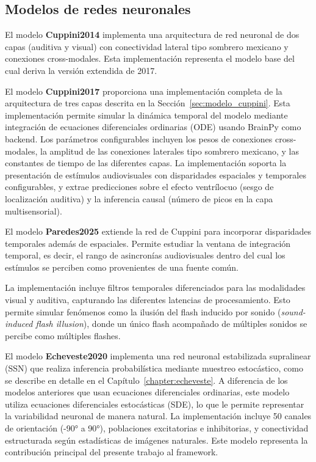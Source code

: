 \subsection{Modelos de redes neuronales}
\label{subsec:snmsi_neurales}

El modelo \textbf{Cuppini2014} implementa una arquitectura de red neuronal de dos capas (auditiva y visual) con conectividad lateral tipo sombrero mexicano y conexiones cross-modales. Esta implementación representa el modelo base del cual deriva la versión extendida de 2017.

El modelo \textbf{Cuppini2017} proporciona una implementación completa de la arquitectura de tres capas descrita en la Sección~\ref{sec:modelo_cuppini}. Esta implementación permite simular la dinámica temporal del modelo mediante integración de ecuaciones diferenciales ordinarias (ODE) usando BrainPy como backend. Los parámetros configurables incluyen los pesos de conexiones cross-modales, la amplitud de las conexiones laterales tipo sombrero mexicano, y las constantes de tiempo de las diferentes capas. La implementación soporta la presentación de estímulos audiovisuales con disparidades espaciales y temporales configurables, y extrae predicciones sobre el efecto ventrílocuo (sesgo de localización auditiva) y la inferencia causal (número de picos en la capa multisensorial).

El modelo \textbf{Paredes2025} extiende la red de Cuppini para incorporar disparidades temporales además de espaciales. Permite estudiar la ventana de integración temporal, es decir, el rango de asincronías audiovisuales dentro del cual los estímulos se perciben como provenientes de una fuente común.

La implementación incluye filtros temporales diferenciados para las modalidades visual y auditiva, capturando las diferentes latencias de procesamiento. Esto permite simular fenómenos como la ilusión del flash inducido por sonido (\textit{sound-induced flash illusion}), donde un único flash acompañado de múltiples sonidos se percibe como múltiples flashes.

El modelo \textbf{Echeveste2020} implementa una red neuronal estabilizada supralinear (SSN) que realiza inferencia probabilística mediante muestreo estocástico, como se describe en detalle en el Capítulo~\ref{chapter:echeveste}. A diferencia de los modelos anteriores que usan ecuaciones diferenciales ordinarias, este modelo utiliza ecuaciones diferenciales estocásticas (SDE), lo que le permite representar la variabilidad neuronal de manera natural. La implementación incluye 50 canales de orientación (-90° a 90°), poblaciones excitatorias e inhibitorias, y conectividad estructurada según estadísticas de imágenes naturales. Este modelo representa la contribución principal del presente trabajo al framework.

